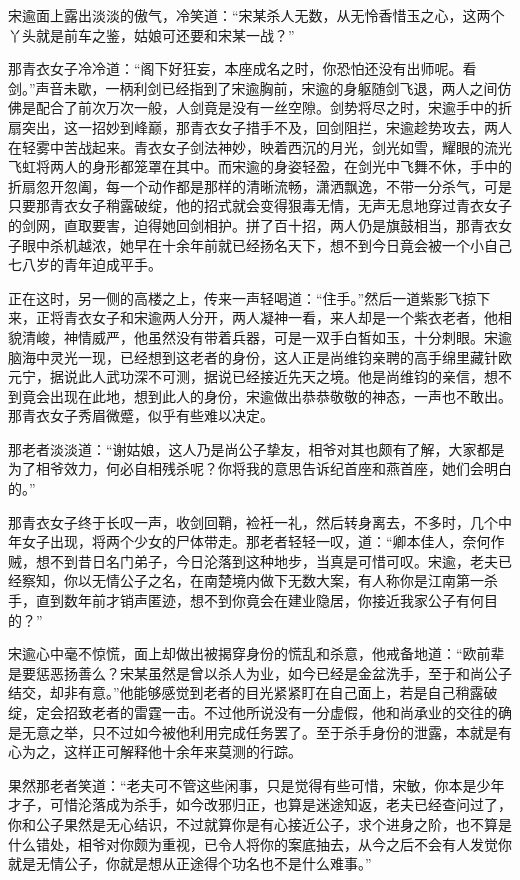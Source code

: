 宋逾面上露出淡淡的傲气，冷笑道：“宋某杀人无数，从无怜香惜玉之心，这两个丫头就是前车之鉴，姑娘可还要和宋某一战？”

那青衣女子冷冷道：“阁下好狂妄，本座成名之时，你恐怕还没有出师呢。看剑。”声音未歇，一柄利剑已经指到了宋逾胸前，宋逾的身躯随剑飞退，两人之间仿佛是配合了前次万次一般，人剑竟是没有一丝空隙。剑势将尽之时，宋逾手中的折扇突出，这一招妙到峰巅，那青衣女子措手不及，回剑阻拦，宋逾趁势攻去，两人在轻雾中苦战起来。青衣女子剑法神妙，映着西沉的月光，剑光如雪，耀眼的流光飞虹将两人的身形都笼罩在其中。而宋逾的身姿轻盈，在剑光中飞舞不休，手中的折扇忽开忽阖，每一个动作都是那样的清晰流畅，潇洒飘逸，不带一分杀气，可是只要那青衣女子稍露破绽，他的招式就会变得狠毒无情，无声无息地穿过青衣女子的剑网，直取要害，迫得她回剑相护。拼了百十招，两人仍是旗鼓相当，那青衣女子眼中杀机越浓，她早在十余年前就已经扬名天下，想不到今日竟会被一个小自己七八岁的青年迫成平手。

正在这时，另一侧的高楼之上，传来一声轻喝道：“住手。”然后一道紫影飞掠下来，正将青衣女子和宋逾两人分开，两人凝神一看，来人却是一个紫衣老者，他相貌清峻，神情威严，他虽然没有带着兵器，可是一双手白皙如玉，十分刺眼。宋逾脑海中灵光一现，已经想到这老者的身份，这人正是尚维钧亲聘的高手绵里藏针欧元宁，据说此人武功深不可测，据说已经接近先天之境。他是尚维钧的亲信，想不到竟会出现在此地，想到此人的身份，宋逾做出恭恭敬敬的神态，一声也不敢出。那青衣女子秀眉微蹙，似乎有些难以决定。

那老者淡淡道：“谢姑娘，这人乃是尚公子挚友，相爷对其也颇有了解，大家都是为了相爷效力，何必自相残杀呢？你将我的意思告诉纪首座和燕首座，她们会明白的。”

那青衣女子终于长叹一声，收剑回鞘，裣衽一礼，然后转身离去，不多时，几个中年女子出现，将两个少女的尸体带走。那老者轻轻一叹，道：“卿本佳人，奈何作贼，想不到昔日名门弟子，今日沦落到这种地步，当真是可惜可叹。宋逾，老夫已经察知，你以无情公子之名，在南楚境内做下无数大案，有人称你是江南第一杀手，直到数年前才销声匿迹，想不到你竟会在建业隐居，你接近我家公子有何目的？”

宋逾心中毫不惊慌，面上却做出被揭穿身份的慌乱和杀意，他戒备地道：“欧前辈是要惩恶扬善么？宋某虽然是曾以杀人为业，如今已经是金盆洗手，至于和尚公子结交，却非有意。”他能够感觉到老者的目光紧紧盯在自己面上，若是自己稍露破绽，定会招致老者的雷霆一击。不过他所说没有一分虚假，他和尚承业的交往的确是无意之举，只不过如今被他利用完成任务罢了。至于杀手身份的泄露，本就是有心为之，这样正可解释他十余年来莫测的行踪。

果然那老者笑道：“老夫可不管这些闲事，只是觉得有些可惜，宋敏，你本是少年才子，可惜沦落成为杀手，如今改邪归正，也算是迷途知返，老夫已经查问过了，你和公子果然是无心结识，不过就算你是有心接近公子，求个进身之阶，也不算是什么错处，相爷对你颇为重视，已令人将你的案底抽去，从今之后不会有人发觉你就是无情公子，你就是想从正途得个功名也不是什么难事。”

